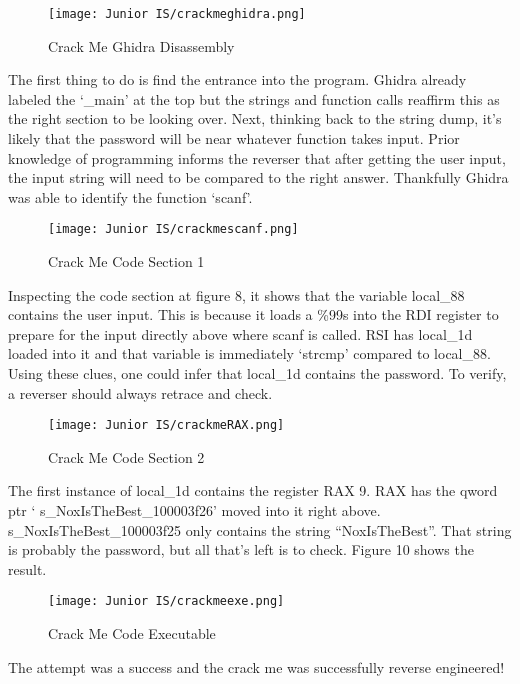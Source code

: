 \documentclass[12pt]{article}
\begin{document}
\begin{figure}[h]
\caption{Crack Me Ghidra Disassembly}
\texttt{[image: Junior IS/crackmeghidra.png]}
\end{figure}

The first thing to do is find the entrance into the program. Ghidra already labeled the ‘\_main’ at the top but the strings and function calls reaffirm this as the right section to be looking over. Next, thinking back to the string dump, it’s likely that the password will be near whatever function takes input. Prior knowledge of programming informs the reverser that after getting the user input, the input string will need to be compared to the right answer. Thankfully Ghidra was able to identify the function ‘scanf’.

\begin{figure}[h]
\caption{Crack Me Code Section 1}
\texttt{[image: Junior IS/crackmescanf.png]}
\end{figure}

Inspecting the code section at figure 8, it shows that the variable local\_88 contains the user input. This is because it loads a \%99s into the RDI register to prepare for the input directly above where scanf is called. RSI has local\_1d loaded into it and that variable is immediately ‘strcmp’ compared to local\_88. Using these clues, one could infer that local\_1d contains the password. To verify, a reverser should always retrace and check.

\begin{figure}[h]
\caption{Crack Me Code Section 2}
\texttt{[image: Junior IS/crackmeRAX.png]}
\end{figure}

The first instance of local\_1d contains the register RAX 9. RAX has the qword ptr ‘ s\_NoxIsTheBest\_100003f26’ moved into it right above. s\_NoxIsTheBest\_100003f25 only contains the string “NoxIsTheBest”. That string is probably the password, but all that’s left is to check. Figure 10 shows the result.
\clearpage
\begin{figure}[h!]
\caption{Crack Me Code Executable}
\texttt{[image: Junior IS/crackmeexe.png]}
\end{figure}
The attempt was a success and the crack me was successfully reverse engineered!
\end{document}
